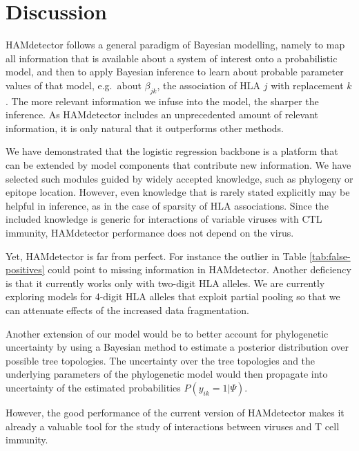\documentclass{bioinfo}
\begin{document}
\section{Discussion}

HAMdetector follows a general paradigm of Bayesian modelling, namely to map all information that is available about a system of interest onto a probabilistic model, and then to apply Bayesian inference to learn about probable parameter values of that model, e.g.\ about $\beta_{jk}$, the association of HLA $j$ with replacement $k$. The more relevant information we infuse into the model, the sharper the inference. As HAMdetector includes an unprecedented amount of relevant information, it is only natural that it outperforms other methods.

We have demonstrated that the logistic regression backbone is a platform that can be extended by model components that contribute new information. We have selected such modules guided by widely accepted knowledge, such as phylogeny or epitope location. However, even knowledge that is rarely stated explicitly may be helpful in inference, as in the case of sparsity of HLA associations. Since the included knowledge is generic for interactions of variable viruses with CTL immunity, HAMdetector performance does not depend on the virus.

Yet, HAMdetector is far from perfect. For instance the outlier in Table \ref{tab:false-positives} could point to missing information in HAMdetector. Another deficiency is that it currently works only with two-digit HLA alleles. We are currently exploring models for 4-digit HLA alleles that exploit partial pooling so that we can attenuate effects of the increased data fragmentation.

Another extension of our model would be to better account for phylogenetic uncertainty by using a Bayesian method to estimate a posterior distribution over possible tree topologies. The uncertainty over the tree topologies and the underlying parameters of the phylogenetic model would then propagate into uncertainty of the estimated probabilities \(P(y_{ik}=1|\Psi)\).

However, the good performance of the current version of HAMdetector makes it already a valuable tool for the study of interactions between viruses and T cell immunity.

%
%
\end{document}
